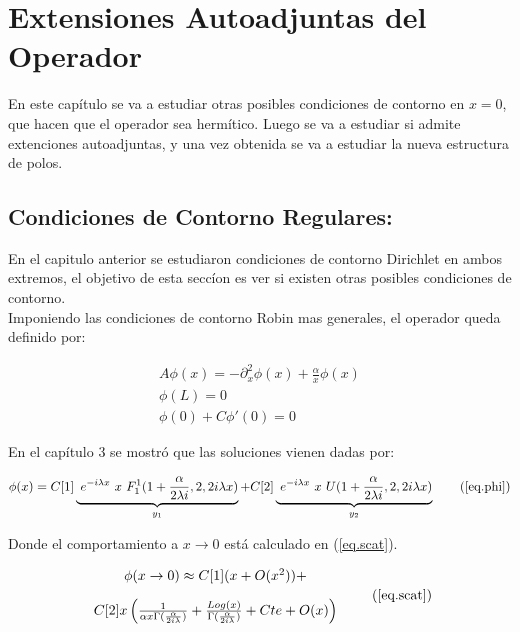 \chapter{Extensiones Autoadjuntas del Operador}

	En este capítulo se va a estudiar otras posibles condiciones de contorno en $x=0$, que hacen que el operador sea hermítico. Luego se va a estudiar si admite extenciones autoadjuntas, y una vez obtenida se va a estudiar la nueva estructura de polos. 


\section{Condiciones de Contorno Regulares:}

En el capitulo anterior se estudiaron condiciones de contorno Dirichlet en ambos extremos, el objetivo de esta seccíon es ver si existen otras posibles condiciones de contorno.\\

Imponiendo las condiciones de contorno Robin mas generales, el operador queda definido por:

\begin{equation}
\begin{array}{c}
    A \phi (x) = - \partial ^2 _x  \phi(x) + \frac{\alpha}{x} \phi(x) \\
    \phi(L) = 0 \\
    \phi (0) + C \phi'(0) = 0 
\end{array}
\label{operador}
\end{equation}



En el capítulo 3 se mostró que las soluciones vienen dadas por:

\begin{equation}
    \phi (x) = 
    C[1]
    \underbrace{
     \ e ^{-i \lambda x} \ x \ F _{1} ^{1} (1+\frac{ \alpha}{2 \lambda i },2,2 i \lambda x) } _ {y_1}
    + C[2] \underbrace{ \ e^{-i \lambda x } \ x \ U (1+\frac{ \alpha}{2 \lambda i },2,2 i \lambda x) } _{y_2} 
\tag{\ref{eq.phi}}
\end{equation}

Donde el comportamiento a $x \rightarrow 0$ está calculado en (\ref{eq.scat}).

\begin{equation}
\begin{array}{c}
\phi (x \rightarrow 0) \approx
C[1] ( x + O(x ^2)) + \\[10pt]
C[2] x 
\left( 
\frac{1}{  \alpha x  \Gamma ( \frac{ \alpha}{2 i \lambda}  )   }  +
\frac{Log(x) }{\Gamma ( \frac{ \alpha}{2 i \lambda} ) } + Cte + O(x)
\right)
\end{array}
\tag{\ref{eq.scat}}
\end{equation}


